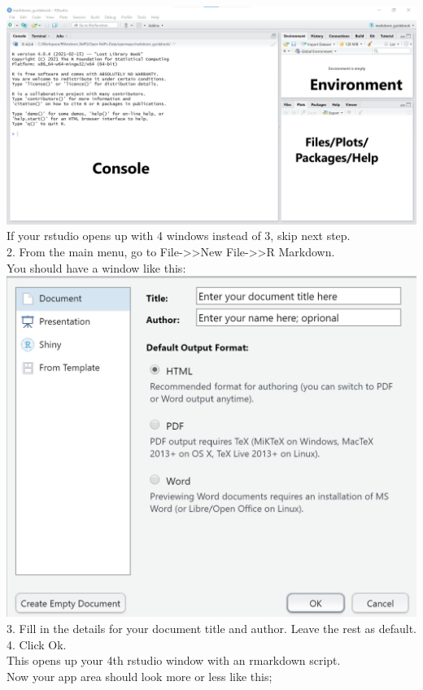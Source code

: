 \documentclass[
]{book}
\begin{document}
\includegraphics{tutorial_screenshots/rstudio_panels.png}\\
If your rstudio opens up with 4 windows instead of 3, skip next step.\\
2. From the main menu, go to File-\textgreater\textgreater New File-\textgreater\textgreater R Markdown.\\
You should have a window like this:\\
\includegraphics{tutorial_screenshots/open_rmd_file.png}\\
3. Fill in the details for your document title and author. Leave the rest as default.\\
4. Click Ok.\\
This opens up your 4th rstudio window with an rmarkdown script.\\
Now your app area should look more or less like this;\\
\end{document}
